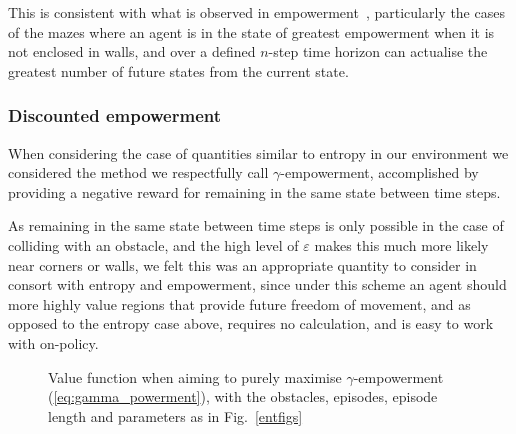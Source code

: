 \documentclass{article}
\begin{document}
This is consistent with what is observed in empowerment~\citep{klyubin2005empowerment}, particularly the cases of the mazes where an agent is in the state of greatest empowerment when it is not enclosed in walls, and over a defined $n$-step time horizon can actualise the greatest number of future states from the current state.

\subsubsection{Discounted empowerment\label{gammares_exp}}
When considering the case of quantities similar to entropy in our environment we considered the method we respectfully call $\gamma$-empowerment, accomplished by providing a negative reward for remaining in the same state between time steps.

As remaining in the same state between time steps is only possible in the case of colliding with an obstacle, and the high level of $\varepsilon$ makes this much more likely near corners or walls, we felt this was an appropriate quantity to consider in consort with entropy and empowerment, since under this scheme an agent should more highly value regions that provide future freedom of movement, and as opposed to the entropy case above, requires no calculation, and is easy to work with on-policy.

\begin{figure}[ht]

\centering
{}
\caption{Value function when aiming to purely maximise $\gamma$-empowerment (\ref{eq:gamma_powerment}), with the obstacles, episodes, episode length and parameters as in Fig.~\ref{entfigs}\label{entsimilarfigs}}
\end{figure}
\end{document}
